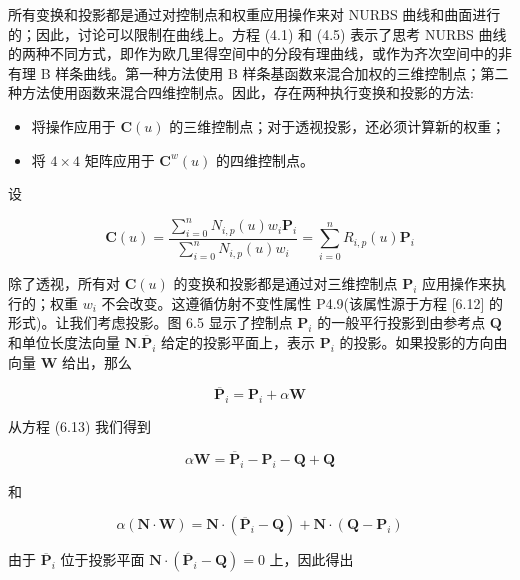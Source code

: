 \documentclass[../main.tex]{subfiles}
\begin{document}
所有变换和投影都是通过对控制点和权重应用操作来对 NURBS 曲线和曲面进行的；因此，讨论可以限制在曲线上。方程 (4.1) 和 (4.5) 表示了思考 NURBS 曲线的两种不同方式，即作为欧几里得空间中的分段有理曲线，或作为齐次空间中的非有理 B 样条曲线。第一种方法使用 B 样条基函数来混合加权的三维控制点；第二种方法使用函数来混合四维控制点。因此，存在两种执行变换和投影的方法:

\begin{itemize}
\item 将操作应用于 \(\mathbf{C}\left( u\right)\) 的三维控制点；对于透视投影，还必须计算新的权重；
\end{itemize}

\begin{itemize}
\item 将 \(4 \times  4\) 矩阵应用于 \({\mathbf{C}}^{w}\left( u\right)\) 的四维控制点。
\end{itemize}

设

\[
\mathbf{C}\left( u\right)  = \frac{\mathop{\sum }\limits_{{i = 0}}^{n}{N}_{i,p}\left( u\right) {w}_{i}{\mathbf{P}}_{i}}{\mathop{\sum }\limits_{{i = 0}}^{n}{N}_{i,p}\left( u\right) {w}_{i}} = \mathop{\sum }\limits_{{i = 0}}^{n}{R}_{i,p}\left( u\right) {\mathbf{P}}_{i} \tag{6.12}
\]

除了透视，所有对 \(\mathbf{C}\left( u\right)\) 的变换和投影都是通过对三维控制点 \({\mathbf{P}}_{i}\) 应用操作来执行的；权重 \({w}_{i}\) 不会改变。这遵循仿射不变性属性 P4.9(该属性源于方程 [6.12] 的形式)。让我们考虑投影。图 6.5 显示了控制点 \({\mathbf{P}}_{i}\) 的一般平行投影到由参考点 \(\mathbf{Q}\) 和单位长度法向量 \(\mathbf{N}.{\overline{\mathbf{P}}}_{i}\) 给定的投影平面上，表示 \({\mathbf{P}}_{i}\) 的投影。如果投影的方向由向量 \(\mathbf{W}\) 给出，那么

\[
{\overline{\mathbf{P}}}_{i} = {\mathbf{P}}_{i} + \alpha \mathbf{W} \tag{6.13}
\]



从方程 (6.13) 我们得到

\[
\alpha \mathbf{W} = {\overline{\mathbf{P}}}_{i} - {\mathbf{P}}_{i} - \mathbf{Q} + \mathbf{Q}
\]

和

\[
\alpha \left( {\mathbf{N} \cdot  \mathbf{W}}\right)  = \mathbf{N} \cdot  \left( {{\overline{\mathbf{P}}}_{i} - \mathbf{Q}}\right)  + \mathbf{N} \cdot  \left( {\mathbf{Q} - {\mathbf{P}}_{i}}\right)
\]

由于 \({\overline{\mathbf{P}}}_{i}\) 位于投影平面 \(\mathbf{N} \cdot  \left( {{\overline{\mathbf{P}}}_{i} - \mathbf{Q}}\right)  = 0\) 上，因此得出
\end{document}
